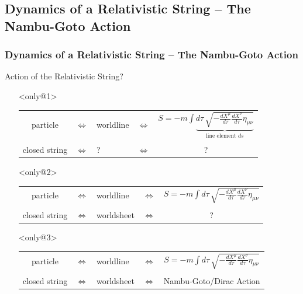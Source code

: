 \documentclass[aspectratio=169]{beamer}
\begin{document}
	\subsection{Dynamics of a Relativistic String -- The Nambu-Goto Action}
	
	\begin{frame}[t]
		\frametitle{Dynamics of a Relativistic String -- The Nambu-Goto Action}
		Action of the Relativistic String?
		\begin{itemize}
			\item[]<only@1>
			\begin{center}
				\begin{tabular}{ccp{1.8cm}cc}
					particle & $\Leftrightarrow$ & worldline & $\Leftrightarrow$ & ${\displaystyle S = -m \int } \underbrace{d\tau \,\sqrt{-\frac{dX^\mu}{d\tau} \frac{dX^\nu}{d\tau}\eta_{\mu\nu}} }_{\text{line element }ds} $ \\[0.7cm]
					&&&&\\
					closed string & $\Leftrightarrow$ &\hphantom{worl} ? \hphantom{heet}& $\Leftrightarrow$ & ? \\
				\end{tabular}
			\end{center}
			\item[]<only@2>
			\begin{center}
				\begin{tabular}{ccp{1.8cm}cc}
					particle & $\Leftrightarrow$ & worldline & $\Leftrightarrow$ & ${\displaystyle S = -m \int d\tau \,\sqrt{-\frac{dX^\mu}{d\tau} \frac{dX^\nu}{d\tau}\eta_{\mu\nu}} }$ \\[0.7cm]
					&&&&\\
					closed string & $\Leftrightarrow$ & worldsheet & $\Leftrightarrow$ & ? \\
				\end{tabular}
			\end{center}
			\item[]<only@3>
			\begin{center}
				\begin{tabular}{ccp{1.8cm}cc}
					particle & $\Leftrightarrow$ & worldline & $\Leftrightarrow$ & ${\displaystyle S = -m \int d\tau \,\sqrt{-\frac{dX^\mu}{d\tau} \frac{dX^\nu}{d\tau}\eta_{\mu\nu}} }$ \\[0.7cm]
					&&&&\\
					closed string & $\Leftrightarrow$ & worldsheet & $\Leftrightarrow$ & Nambu-Goto/Dirac Action \\
				\end{tabular}
			\end{center}
		\end{itemize}
	\end{frame}
\end{document}
